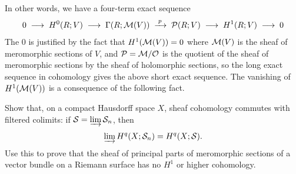 \documentclass[12pt]{article}
\begin{document}
In other words, we have a four-term exact sequence
\begin{equation}
    0 \;\longrightarrow\; H^{0}(R;V) \;\longrightarrow\;
    \Gamma(R;{\mathcal{M}}(V)) \;\xrightarrow{\;p\;}\;
    {\mathcal{P}}(R;V) \;\longrightarrow\; H^{1}(R;V) \;\longrightarrow\; 0
\end{equation}
The $0$ is justified by the fact that $H^1({\mathcal{M}}(V))=0$ where ${\mathcal{M}}(V)$ is the sheaf of meromorphic sections of $V$, and ${\mathcal{P}} = {\mathcal{M}}/{\mathcal{O}}$ is the quotient of the sheaf of meromorphic sections by the sheaf of holomorphic sections, so the long exact sequence in cohomology gives the above short exact sequence. The vanishing of $H^1({\mathcal{M}}(V))$ is a consequence of the following fact.

\begin{exercise}

    Show that, on a compact Hausdorff space $X$, sheaf cohomology commutes with filtered colimits: if $\mathcal{S} = \varinjlim \mathcal{S}_n$, then
    \[
        \varinjlim H^q(X; \mathcal{S}_n) = H^q(X; \mathcal{S}).
    \]
    Use this to prove that the sheaf of principal parts of meromorphic sections of a vector bundle on a Riemann surface has no $H^1$ or higher cohomology.
\end{exercise}
\end{document}
